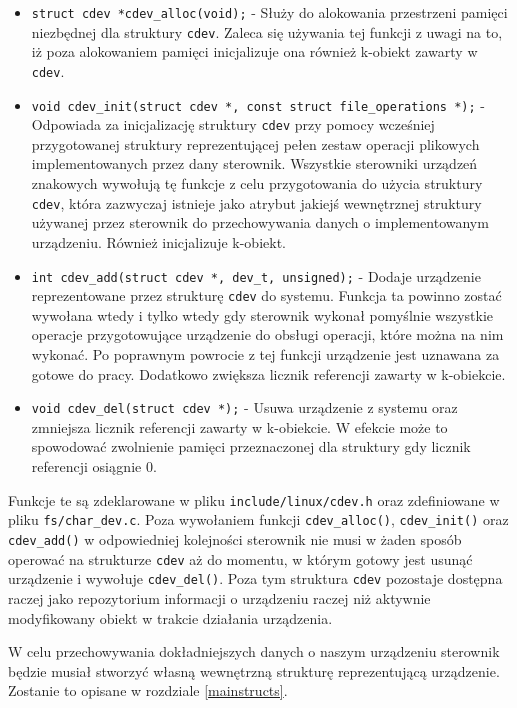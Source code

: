 \documentclass[10pt]{article}
\begin{document}
\begin{itemize}
\item
  \texttt{struct cdev *cdev\_alloc(void);} - Służy do alokowania przestrzeni pamięci niezbędnej dla struktury \texttt{cdev}. Zaleca się używania tej funkcji z uwagi na to, iż poza alokowaniem pamięci inicjalizuje ona również k-obiekt zawarty w \texttt{cdev}.
\item
  \texttt{void cdev\_init(struct cdev *, const struct file\_operations *);} - Odpowiada za inicjalizację struktury \texttt{cdev} przy pomocy wcześniej przygotowanej struktury reprezentującej pełen zestaw operacji plikowych implementowanych przez dany sterownik. Wszystkie sterowniki urządzeń znakowych wywołują tę funkcje z celu przygotowania do użycia struktury \texttt{cdev}, która zazwyczaj istnieje jako atrybut jakiejś wewnętrznej struktury używanej przez sterownik do przechowywania danych o implementowanym urządzeniu. Również inicjalizuje k-obiekt.
\item
  \texttt{int cdev\_add(struct cdev *, dev\_t, unsigned);} - Dodaje urządzenie reprezentowane przez strukturę \texttt{cdev} do systemu.  Funkcja ta powinno zostać wywołana wtedy i tylko wtedy gdy sterownik wykonał pomyślnie wszystkie operacje przygotowujące urządzenie do obsługi operacji, które można na nim wykonać. Po poprawnym powrocie z tej funkcji urządzenie jest uznawana za gotowe do pracy. Dodatkowo zwiększa licznik referencji zawarty w k-obiekcie.
\item
  \texttt{void cdev\_del(struct cdev *);} - Usuwa urządzenie z systemu oraz zmniejsza licznik referencji zawarty w k-obiekcie. W efekcie może to spowodować zwolnienie pamięci przeznaczonej dla struktury gdy licznik referencji osiągnie 0.
\end{itemize}

Funkcje te są zdeklarowane w pliku \texttt{include/linux/cdev.h} oraz zdefiniowane w pliku \texttt{fs/char\_dev.c}. Poza wywołaniem funkcji \texttt{cdev\_alloc()}, \texttt{cdev\_init()} oraz \texttt{cdev\_add()} w odpowiedniej kolejności sterownik nie musi w żaden sposób operować na strukturze \texttt{cdev} aż do momentu, w którym gotowy jest usunąć urządzenie i wywołuje \texttt{cdev\_del()}. Poza tym struktura \texttt{cdev} pozostaje dostępna raczej jako repozytorium informacji o urządzeniu raczej niż aktywnie modyfikowany obiekt w trakcie działania urządzenia.

W celu przechowywania dokładniejszych danych o naszym urządzeniu sterownik będzie musiał stworzyć własną wewnętrzną strukturę reprezentującą urządzenie. Zostanie to opisane w rozdziale \ref{mainstructs}.
\end{document}
